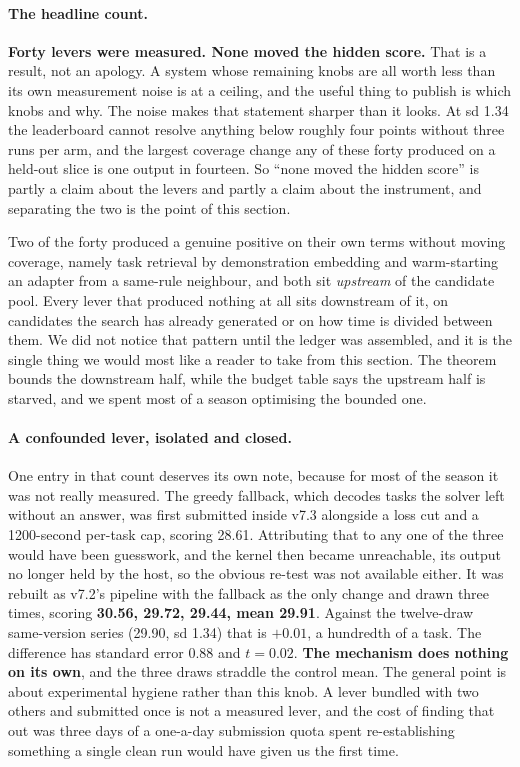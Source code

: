 \documentclass[11pt]{article}
\begin{document}
\paragraph{The headline count.} \textbf{Forty levers were measured. None moved the hidden
score.} That is a result, not an apology. A system whose remaining knobs are all worth
less than its own measurement noise is at a ceiling, and the useful thing to publish is which knobs
and why. The noise makes that statement sharper than it looks. At sd 1.34 the leaderboard cannot
resolve anything below roughly four points without three runs per arm, and the largest coverage change
any of these forty produced on a held-out slice is one output in fourteen. So ``none moved the
hidden score'' is partly a claim about the levers and partly a claim about the instrument, and
separating the two is the point of this section.

Two of the forty produced a genuine positive on their own terms without moving coverage, namely
task retrieval by demonstration embedding and warm-starting an adapter from a same-rule neighbour,
and both sit \emph{upstream} of the candidate pool. Every lever that produced nothing at all sits
downstream of it, on candidates the search has already generated or on how time is divided between
them. We did not notice that pattern until the ledger was assembled, and it is the single thing we
would most like a reader to take from this section. The theorem bounds the downstream half, while the
budget table says the upstream half is starved, and we spent most of a season optimising the bounded
one.

\paragraph{A confounded lever, isolated and closed.} One entry in that count deserves its own note,
because for most of the season it was not really measured. The greedy fallback, which decodes tasks
the solver left without an answer, was first submitted inside v7.3 alongside a loss cut and a
1200-second per-task cap, scoring 28.61. Attributing that to any one of the three would have been
guesswork, and the kernel then became unreachable, its output no longer held by the host, so the
obvious re-test was not available either. It was rebuilt as v7.2's pipeline with the fallback as the
only change and drawn three times, scoring \textbf{30.56, 29.72, 29.44, mean 29.91}. Against the
twelve-draw same-version series (29.90, sd 1.34) that is $+0.01$, a hundredth of a task. The
difference has standard error 0.88 and $t=0.02$. \textbf{The mechanism does nothing on its own}, and
the three draws straddle the control mean. The general point is
about experimental hygiene rather than this knob. A lever bundled with two others and submitted once
is not a measured lever, and the cost of finding that out was three days of a one-a-day submission
quota spent re-establishing something a single clean run would have given us the first time.
\end{document}
